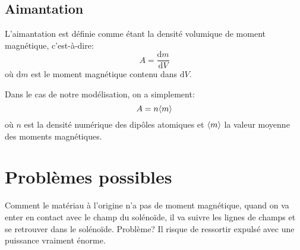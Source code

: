 \documentclass{article}
\begin{document}
\subsection{Aimantation}
L'aimantation est définie comme étant la densité volumique de moment magnétique, c'est-à-dire: $$A = \frac{\mathrm{d}m}{\mathrm{d}V}$$
où $\mathrm{d}m$ est le moment magnétique contenu dans $\mathrm{d}V$.

Dans le cas de notre modélisation, on a simplement:
$$A = n \valmoy{m}$$ où $n$ est la densité numérique des dipôles atomiques et $\valmoy{m}$ la valeur moyenne des moments magnétiques.

\section{Problèmes possibles}
Comment le matériau à l'origine n'a pas de moment magnétique, quand on va enter en contact avec le champ du solénoïde, il va suivre les lignes de champs et se retrouver dans le solénoïde. Problème? Il risque de ressortir expulsé avec une puissance vraiment énorme.
\end{document}
